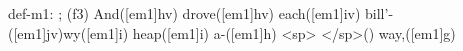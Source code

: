 def-m1: \grealign;
(f3) And([em1]hv) drove([em1]hv) each([em1]iv) bill'-([em1]jv)wy([em1]i) heap([em1]i) a-([em1]h) <sp> </sp>() way,([em1]g)